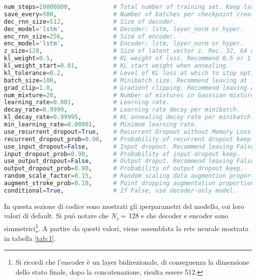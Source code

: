 \begin{minipage}{\linewidth}
\begin{lstlisting}[language = Python, frame = single, caption = {Iperparametri standard di sketch-rnn}, label = {iperparametri}, captionpos = b, basicstyle=\scriptsize]
num_steps=10000000,            # Total number of training set. Keep large.
save_every=500,                # Number of batches per checkpoint creation.
dec_rnn_size=512,              # Size of decoder.
dec_model='lstm',              # Decoder: lstm, layer_norm or hyper.
enc_rnn_size=256,              # Size of encoder.
enc_model='lstm',              # Encoder: lstm, layer_norm or hyper.
z_size=128,                    # Size of latent vector z. Rec. 32, 64 or 128.
kl_weight=0.5,                 # KL weight of loss. Recommend 0.5 or 1.0.
kl_weight_start=0.01,          # KL start weight when annealing.
kl_tolerance=0.2,              # Level of KL loss at which to stop optimizing
batch_size=100,                # Minibatch size. Recommend leaving at 100.
grad_clip=1.0,                 # Gradient clipping. Recommend leaving at 1.0.
num_mixture=20,                # Number of mixtures in Gaussian mixture model.
learning_rate=0.001,           # Learning rate.
decay_rate=0.9999,             # Learning rate decay per minibatch.
kl_decay_rate=0.99995,         # KL annealing decay rate per minibatch.
min_learning_rate=0.00001,     # Minimum learning rate.
use_recurrent_dropout=True,    # Recurrent Dropout without Memory Loss.
recurrent_dropout_prob=0.90,   # Probability of recurrent dropout keep.
use_input_dropout=False,       # Input dropout. Recommend leaving False.
input_dropout_prob=0.90,       # Probability of input dropout keep.
use_output_dropout=False,      # Output droput. Recommend leaving False.
output_dropout_prob=0.90,      # Probability of output dropout keep.
random_scale_factor=0.15,      # Random scaling data augmention proportion.
augment_stroke_prob=0.10,      # Point dropping augmentation proportion.
conditional=True,              # If False, use decoder-only model.
\end{lstlisting}
\end{minipage}
In questa sezione di codice sono mostrati gli iperparametri del modello, coi loro valori di default. Si può notare che \textit{N\textsubscript{z}} = 128 e che decoder e encoder sono simmetrici\footnote{Si ricordi che l'encoder è un layer bidirezionale, di conseguenza la dimensione dello stato finale, dopo la concatenazione, risulta essere 512.}. A partire da questi valori, viene assemblata la rete neurale mostrata in tabella \ref{tab:1}.
